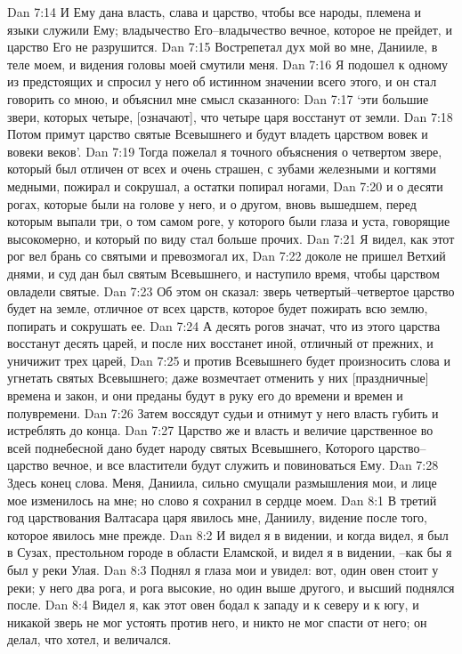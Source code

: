 Dan 7:14  И Ему дана власть, слава и царство, чтобы все народы, племена и языки служили Ему; владычество Его--владычество вечное, которое не прейдет, и царство Его не разрушится.
Dan 7:15  Вострепетал дух мой во мне, Данииле, в теле моем, и видения головы моей смутили меня.
Dan 7:16  Я подошел к одному из предстоящих и спросил у него об истинном значении всего этого, и он стал говорить со мною, и объяснил мне смысл сказанного:
Dan 7:17  `эти большие звери, которых четыре, [означают], что четыре царя восстанут от земли.
Dan 7:18  Потом примут царство святые Всевышнего и будут владеть царством вовек и вовеки веков'.
Dan 7:19  Тогда пожелал я точного объяснения о четвертом звере, который был отличен от всех и очень страшен, с зубами железными и когтями медными, пожирал и сокрушал, а остатки попирал ногами,
Dan 7:20  и о десяти рогах, которые были на голове у него, и о другом, вновь вышедшем, перед которым выпали три, о том самом роге, у которого были глаза и уста, говорящие высокомерно, и который по виду стал больше прочих.
Dan 7:21  Я видел, как этот рог вел брань со святыми и превозмогал их,
Dan 7:22  доколе не пришел Ветхий днями, и суд дан был святым Всевышнего, и наступило время, чтобы царством овладели святые.
Dan 7:23  Об этом он сказал: зверь четвертый--четвертое царство будет на земле, отличное от всех царств, которое будет пожирать всю землю, попирать и сокрушать ее.
Dan 7:24  А десять рогов значат, что из этого царства восстанут десять царей, и после них восстанет иной, отличный от прежних, и уничижит трех царей,
Dan 7:25  и против Всевышнего будет произносить слова и угнетать святых Всевышнего; даже возмечтает отменить у них [праздничные] времена и закон, и они преданы будут в руку его до времени и времен и полувремени.
Dan 7:26  Затем воссядут судьи и отнимут у него власть губить и истреблять до конца.
Dan 7:27  Царство же и власть и величие царственное во всей поднебесной дано будет народу святых Всевышнего, Которого царство--царство вечное, и все властители будут служить и повиноваться Ему.
Dan 7:28  Здесь конец слова. Меня, Даниила, сильно смущали размышления мои, и лице мое изменилось на мне; но слово я сохранил в сердце моем.
Dan 8:1  В третий год царствования Валтасара царя явилось мне, Даниилу, видение после того, которое явилось мне прежде.
Dan 8:2  И видел я в видении, и когда видел, я был в Сузах, престольном городе в области Еламской, и видел я в видении, --как бы я был у реки Улая.
Dan 8:3  Поднял я глаза мои и увидел: вот, один овен стоит у реки; у него два рога, и рога высокие, но один выше другого, и высший поднялся после.
Dan 8:4  Видел я, как этот овен бодал к западу и к северу и к югу, и никакой зверь не мог устоять против него, и никто не мог спасти от него; он делал, что хотел, и величался.
